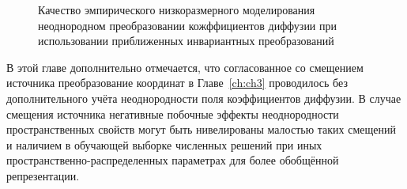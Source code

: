 \begin{figure}[ht]
    \caption{Качество эмпирического низкоразмерного моделирования неоднородном преобразовании кожффициентов диффузии при использовании приближенных инвариантных преобразований~\cite{Elizarev2022}}\label{fig:q-non-uniform}
\end{figure}

В этой главе дополнительно отмечается, что согласованное со смещением источника преобразование координат в Главе~\ref{ch:ch3} проводилось без дополнительного учёта неоднородности поля коэффициентов диффузии. В случае смещения источника негативные побочные эффекты неоднородности пространственных свойств могут быть нивелированы малостью таких смещений и наличием в обучающей выборке численных решений при иных пространственно-распределенных параметрах для более обобщённой репрезентации.

